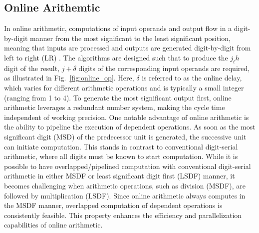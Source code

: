 \documentclass[conference]{IEEEtran}
\begin{document}
\subsection{Online Arithemtic} \label{sec: online}

In online arithmetic, computations of input operands and output flow in a digit-by-digit manner from the most significant to the least significant position, meaning that inputs are processed and outputs are generated digit-by-digit from left to right (LR) \cite{online_overview}. The algorithms are designed such that to produce the $j_th$ digit of the result, $j+\delta$ digits of the corresponding input operands are required, as illustrated in Fig.~\ref{fig:online_op}. Here, $\delta$ is referred to as the online delay, which varies for different arithmetic operations and is typically a small integer (ranging from 1 to 4). To generate the most significant output first, online arithmetic leverages a redundant number system, making the cycle time independent of working precision. One notable advantage of online arithmetic is the ability to pipeline the execution of dependent operations. As soon as the most significant digit (MSD) of the predecessor unit is generated, the successive unit can initiate computation. This stands in contrast to conventional digit-serial arithmetic, where all digits must be known to start computation. While it is possible to have overlapped/pipelined computation with conventional digit-serial arithmetic in either MSDF or least significant digit first (LSDF) manner, it becomes challenging when arithmetic operations, such as division (MSDF), are followed by multiplication (LSDF). Since online arithmetic always computes in the MSDF manner, overlapped computation of dependent operations is consistently feasible. This property enhances the efficiency and parallelization capabilities of online arithmetic.
\end{document}
